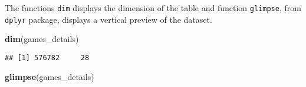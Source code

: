 \documentclass[
]{article}
\newenvironment{Shaded}{\begin{snugshade}}{\end{snugshade}}
\newcommand{\KeywordTok}[1]{\textcolor[rgb]{0.13,0.29,0.53}{\textbf{#1}}}
\newcommand{\NormalTok}[1]{#1}
\begin{document}
The functions \texttt{dim} displays the dimension of the table and
function \texttt{glimpse}, from \texttt{dplyr} package, displays a
vertical preview of the dataset.

\begin{Shaded}
\begin{Highlighting}[]
\KeywordTok{dim}\NormalTok{(games\_details)}
\end{Highlighting}
\end{Shaded}

\begin{verbatim}
## [1] 576782     28
\end{verbatim}

\begin{Shaded}
\begin{Highlighting}[]
\KeywordTok{glimpse}\NormalTok{(games\_details)}
\end{Highlighting}
\end{Shaded}
\end{document}
